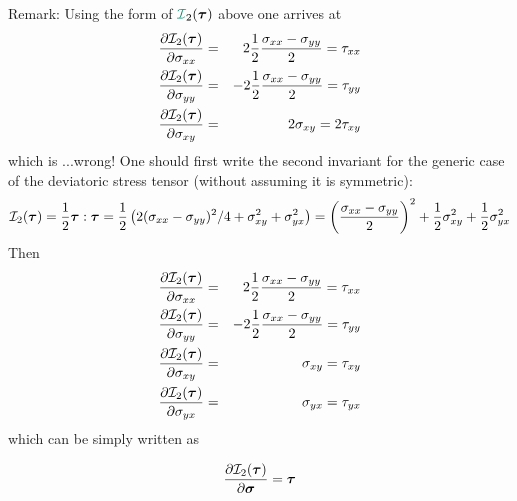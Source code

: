 Remark: Using the form of ${\III}_2(\bm\tau)$ above one arrives at  
\begin{eqnarray}
\frac{\partial {\cal I}_2(\bm\tau)}{\partial \sigma_{xx}} 
&=&  2 \frac{1}{2}  \frac{\sigma_{xx}-\sigma_{yy}}{2} = \tau_{xx}\nonumber \\
\frac{\partial {\cal I}_2(\bm\tau)}{\partial \sigma_{yy}} 
&=& -2 \frac{1}{2}  \frac{\sigma_{xx}-\sigma_{yy}}{2} = \tau_{yy} \nonumber\\
\frac{\partial {\cal I}_2(\bm\tau)}{\partial \sigma_{xy}} 
&=& 2 \sigma_{xy} =  2 \tau_{xy}\nonumber
\end{eqnarray}
which is ...wrong! One should first write the second invariant 
for the generic case of the deviatoric stress tensor (without 
assuming it is symmetric):
\[
{\cal I}_2(\bm\tau) = \frac12 \bm\tau:\bm\tau
= \frac12 \left( 2 (\sigma_{xx}-\sigma_{yy})^2/4 + \sigma_{xy}^2 + \sigma_{yx}^2 \right)
= \left(\frac{\sigma_{xx}-\sigma_{yy}}{2} \right)^2 + \frac12\sigma_{xy}^2 + \frac12\sigma_{yx}^2
\]
Then
\begin{eqnarray}
\frac{\partial {\cal I}_2(\bm\tau)}{\partial \sigma_{xx}} 
&=&  2 \frac{1}{2}  \frac{\sigma_{xx}-\sigma_{yy}}{2} = \tau_{xx} \nonumber\\
\frac{\partial {\cal I}_2(\bm\tau)}{\partial \sigma_{yy}} 
&=& -2 \frac{1}{2}  \frac{\sigma_{xx}-\sigma_{yy}}{2} =  \tau_{yy} \nonumber\\
\frac{\partial {\cal I}_2(\bm\tau)}{\partial \sigma_{xy}} 
&=&  \sigma_{xy} =  \tau_{xy} \nonumber\\
\frac{\partial {\cal I}_2(\bm\tau)}{\partial \sigma_{yx}} 
&=&  \sigma_{yx} =  \tau_{yx} \nonumber
\end{eqnarray}
which can be simply written as
\begin{mdframed}[backgroundcolor=blue!5]
\[
\frac{\partial {\cal I}_2(\bm\tau)}{\partial \bm\sigma} 
=\bm\tau
\]
\end{mdframed}



















